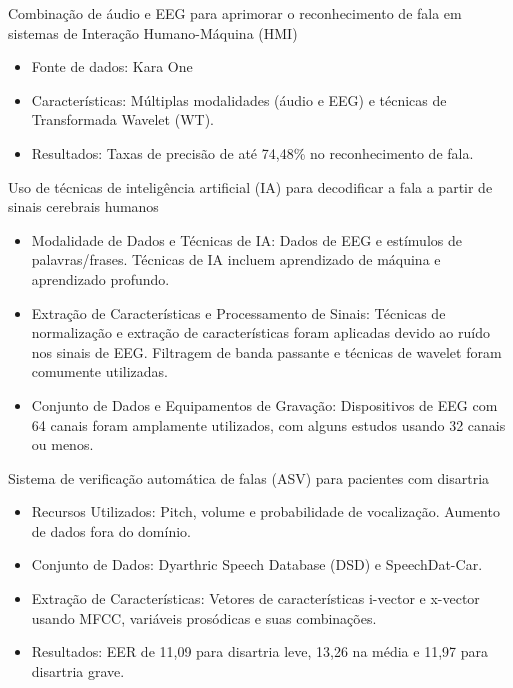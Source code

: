\documentclass{beamer}
\begin{document}
	\begin{frame}{Combinação de áudio e EEG para aprimorar o reconhecimento de fala em sistemas de Interação Humano-Máquina (HMI) \cite{WOS:000591530700001}}
		\begin{itemize}
			\item Fonte de dados: Kara One \cite{zhao2015classifying}
			\item Características: Múltiplas modalidades (áudio e EEG) e técnicas de Transformada Wavelet (WT).
			\item Resultados: Taxas de precisão de até 74,48\% no reconhecimento de fala.
		\end{itemize}
		
	\end{frame}
		
	\begin{frame}{Uso de técnicas de inteligência artificial (IA) para decodificar a fala a partir de sinais cerebrais humanos \cite{WOS:000857544900001}}
		\begin{itemize}
			\item Modalidade de Dados e Técnicas de IA: Dados de EEG e estímulos de palavras/frases. Técnicas de IA incluem aprendizado de máquina e aprendizado profundo.
			\item Extração de Características e Processamento de Sinais: Técnicas de normalização e extração de características foram aplicadas devido ao ruído nos sinais de EEG. Filtragem de banda passante e técnicas de wavelet foram comumente utilizadas.
			\item Conjunto de Dados e Equipamentos de Gravação: Dispositivos de EEG com 64 canais foram amplamente utilizados, com alguns estudos usando 32 canais ou menos.
		\end{itemize}
		
	\end{frame}
	
	\begin{frame}{Sistema de verificação automática de falas (ASV) para pacientes com disartria \cite{salim2023automatic}}
		\begin{itemize}
			\item Recursos Utilizados: Pitch, volume e probabilidade de vocalização. Aumento de dados fora do domínio.
			\item Conjunto de Dados: Dyarthric Speech Database (DSD) e SpeechDat-Car.
			\item Extração de Características: Vetores de características i-vector e x-vector usando MFCC, variáveis prosódicas e suas combinações.
			\item Resultados: EER de 11,09 para disartria leve, 13,26 na média e 11,97 para disartria grave.
		\end{itemize}
		
	\end{frame}
\end{document}
